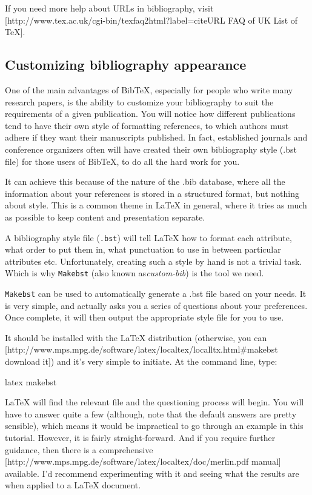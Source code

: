 If you need more help about URLs in bibliography, visit
[http://www.tex.ac.uk/cgi-bin/texfaq2html?label=citeURL FAQ of UK List of TeX].

\subsection{Customizing bibliography appearance}
One of the main advantages of BibTeX, especially for people who write many
research papers, is the ability to customize your bibliography to suit the
requirements of a given publication. You will notice how different publications
tend to have their own style of formatting references, to which authors must
adhere if they want their manuscripts published. In fact, established journals
and conference organizers often will have created their own bibliography style
(.bst file) for those users of BibTeX, to do all the hard work for you.

It can achieve this because of the nature of the .bib database, where all the
information about your references is stored in a structured format, but nothing
about style. This is a common theme in LaTeX in general, where it tries as much
as possible to keep content and presentation separate.

A bibliography style file (\verb|.bst|) will tell LaTeX how to format each
attribute, what order to put them in, what punctuation to use in between
particular attributes etc. Unfortunately, creating such a style by hand is not
a trivial task. Which is why \verb|Makebst| (also known as\textit{custom-bib})
is the tool we need.

\verb|Makebst| can be used to automatically generate a .bst file based on your
needs. It is very simple, and actually asks you a series of questions about
your preferences. Once complete, it will then output the appropriate style file
for you to use.

It should be installed with the LaTeX distribution (otherwise, you can
[http://www.mps.mpg.de/software/latex/localtex/localltx.html\#makebst download
it]) and it's very simple to initiate. At the command line, type:

 latex makebst

LaTeX will find the relevant file and the questioning process will begin. You
will have to answer quite a few (although, note that the default answers are
pretty sensible), which means it would be impractical to go through an example
in this tutorial. However, it is fairly straight-forward. And if you require
further guidance, then there is a comprehensive
[http://www.mps.mpg.de/software/latex/localtex/doc/merlin.pdf manual]
available. I'd recommend experimenting with it and seeing what the results are
when applied to a LaTeX document.

